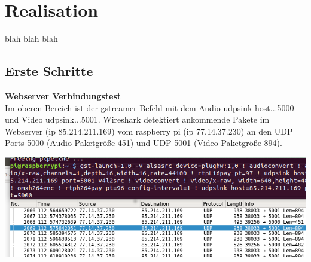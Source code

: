 \section{Realisation}

blah blah blah

\subsection{Erste Schritte}




\textbf{Webserver Verbindungstest}\\
Im oberen Bereich ist der gstreamer Befehl mit dem Audio udpsink host...5000 und Video udpsink...5001. Wireshark detektiert ankommende Pakete im Webserver (ip 85.214.211.169) vom raspberry pi (ip 77.14.37.230) an den UDP Ports 5000 (Audio Paketgröße 451) und UDP 5001 (Video Paketgröße 894).\\

\begin{minipage}{\textwidth}
    \begin{center}
        \includegraphics[scale=0.85]{img/wireshark.png} 
    \end{center}
\end{minipage}



